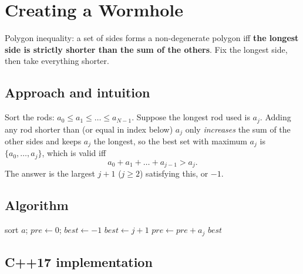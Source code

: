 \section{Creating a Wormhole}
\label{sec:g-wormhole}


\begin{patternbox}
Polygon inequality: a set of sides forms a non-degenerate polygon iff
\textbf{the longest side is strictly shorter than the sum of the others}.
Fix the longest side, then take everything shorter.
\end{patternbox}

\subsection*{Approach and intuition}

Sort the rods: $a_0\le a_1\le\dots\le a_{N-1}$. Suppose the longest rod
used is $a_j$. Adding any rod shorter than (or equal in index below) $a_j$
only \emph{increases} the sum of the other sides and keeps $a_j$ the
longest, so the best set with maximum $a_j$ is $\{a_0,\dots,a_j\}$, which is
valid iff
\[
  a_0+a_1+\dots+a_{j-1} > a_j .
\]
The answer is the largest $j+1$ ($j\ge2$) satisfying this, or $-1$.

\subsection*{Algorithm}
\begin{algorithmic}[1]
\State sort $a$; $pre\gets0$; $best\gets-1$
   \State $best\gets j+1$ \EndIf
  \State $pre\gets pre+a_j$
\EndFor
\State \Return $best$
\end{algorithmic}


\subsection*{C++17 implementation}

